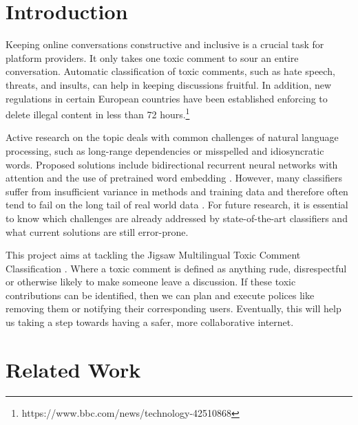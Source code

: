 \documentclass[10pt,twocolumn,letterpaper]{article}
\begin{document}
\section{Introduction}

Keeping online conversations constructive and inclusive is a crucial task for platform providers. It only takes one toxic comment to sour an entire conversation. Automatic classification of toxic comments, such as hate speech, threats, and insults, can help in keeping discussions fruitful. In addition, new regulations in certain European countries have been established enforcing to delete illegal content in less than 72 hours.\footnote {https://www.bbc.com/news/technology-42510868}

Active research on the topic deals with common challenges of natural language processing, such as long-range dependencies or misspelled and idiosyncratic words. Proposed solutions include bidirectional recurrent neural networks with attention \cite{r01} and the use of pretrained word embedding \cite{r02}. However, many classifiers suffer from insufficient variance in methods and training data and therefore often tend to fail on the long tail of real world data \cite{r03}. For future research, it is essential to know which challenges are already addressed by state-of-the-art classifiers and what current solutions are still error-prone.

This project aims at tackling the Jigsaw Multilingual Toxic Comment Classification \cite{Jigsaw}. Where a toxic comment is defined as anything rude, disrespectful or otherwise likely to make someone leave a discussion. If these toxic contributions can be identified, then we can plan and execute polices like removing them or notifying their corresponding users. Eventually, this will help us taking a step towards having a safer, more collaborative internet. 

\section{Related Work}
\end{document}
